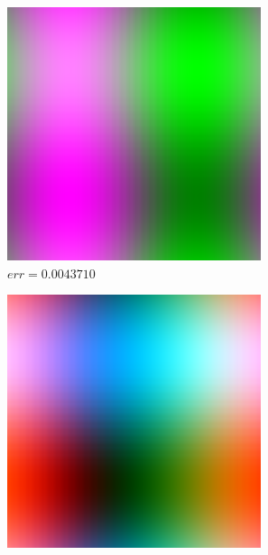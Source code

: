 \documentclass[12pt, a4paper]{article}
\begin{document}
    \begin{figure}[h!]
        \begin{subfigure}{.3\textwidth}
            \includegraphics[width=.95\textwidth]{../fstFunBC.png}
            \caption{$err = 0.0043710$}
        \end{subfigure}
        \begin{subfigure}{.3\textwidth}
            \includegraphics[width=.95\textwidth]{../secFunBC.png}

\end{subfigure}
\end{figure}
\end{document}
